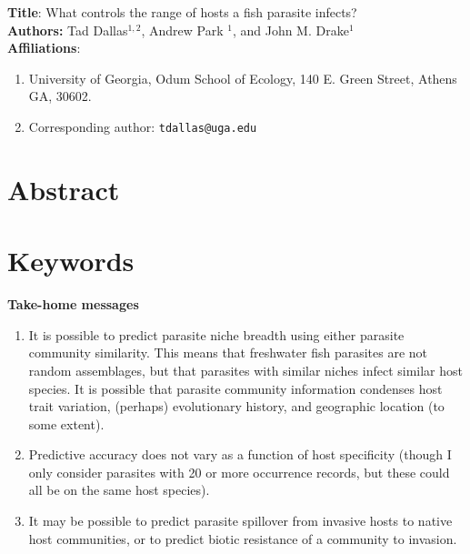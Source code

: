 \documentclass[12pt]{article}
\begin{document}
\setcounter{page}{1}

\textbf{Title}: What controls the range of hosts a fish parasite infects? \\
\vspace{0.5cm}
\textbf{Authors:} Tad Dallas$^{1,2}$, Andrew Park $^{1}$, and John M. Drake$^{1}$ \\
\vspace{0.5cm}
\textbf{Affiliations}: 
\begin{enumerate}
  \item University of Georgia, Odum School of Ecology, 140 E. Green Street, Athens GA, 30602. 
  \item Corresponding author: \texttt{tdallas@uga.edu}
\end{enumerate}


\linenumbers
\doublespacing


\section{Abstract}






\section{Keywords}





\textbf{Take-home messages} \\
\begin{enumerate}
 \item It is possible to predict parasite niche breadth using either parasite community similarity. This means that freshwater fish parasites are not random assemblages, but that parasites with similar niches infect similar host species. It is possible that parasite community information condenses host trait variation, (perhaps) evolutionary history, and geographic location (to some extent).   

 \item Predictive accuracy does not vary as a function of host specificity (though I only consider parasites with 20 or more occurrence records, but these could all be on the same host species).
 
 \item It may be possible to predict parasite spillover from invasive hosts to native host communities, or to predict biotic resistance of a community to invasion. 
\end{enumerate}
\end{document}
